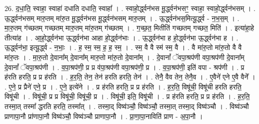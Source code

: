 \documentclass[17pt]{extarticle}
\begin{document}
26. द॒धा॒ति॒ स्वाहा॒ स्वाहा॑ दधाति दधाति॒ स्वाहा᳚ । . स्वाहो॒र्द्ध्वन॑भस मू॒र्द्ध्वन॑भसꣳ॒॒ स्वाहा॒ स्वाहो॒र्द्ध्वन॑भसम् । . ऊ॒र्द्ध्वन॑भसम् मारु॒तम् मा॑रु॒त मू॒र्द्ध्वन॑भस मू॒र्द्ध्वन॑भसम् मारु॒तम् । . ऊ॒र्द्ध्वन॑भस॒मित्यू॒र्द्ध्व - न॒भ॒स॒म् । . मा॒रु॒तम् ग॑च्छतम् गच्छतम् मारु॒तम् मा॑रु॒तम् ग॑च्छतम् । . ग॒च्छ॒त॒ मितीति॑ गच्छतम् गच्छत॒ मिति॑ । . इत्या॑हा॒हे तीत्या॑ह । . आ॒हो॒र्द्ध्वन॑भा ऊ॒र्द्ध्वन॑भा आहा हो॒र्द्ध्वन॑भाः । . ऊ॒र्द्ध्वन॑भा ह हो॒र्द्ध्वन॑भा ऊ॒र्द्ध्वन॑भा ह । . ऊ॒र्द्ध्वन॑भा॒ इत्यू॒र्द्ध्व - न॒भाः॒ । . ह॒ स्म॒ स्म॒ ह॒ ह॒ स्म॒ । . स्म॒ वै वै स्म॑ स्म॒ वै । . वै मा॑रु॒तो मा॑रु॒तो वै वै मा॑रु॒तः । . मा॒रु॒तो दे॒वाना᳚म् दे॒वाना᳚म् मारु॒तो मा॑रु॒तो दे॒वाना᳚म् । . दे॒वानां᳚ ॅवपा॒श्रप॑णी वपा॒श्रप॑णी दे॒वाना᳚म् दे॒वानां᳚ ॅवपा॒श्रप॑णी । . व॒पा॒श्रप॑णी॒ प्र प्र व॑पा॒श्रप॑णी वपा॒श्रप॑णी॒ प्र । . व॒पा॒श्रप॑णी॒ इति॑ वपा - श्रप॑णी । . प्र ह॑रति हरति॒ प्र प्र ह॑रति । . ह॒र॒ति॒ तेन॒ तेन॑ हरति हरति॒ तेन॑ । . तेनै॒ वैव तेन॒ तेनै॒व । . ए॒वैने॑ एने ए॒वै वैने᳚ । . ए॒ने॒ प्र प्रैने॑ एने॒ प्र । . ए॒ने॒ इत्ये॑ने । . प्र ह॑रति हरति॒ प्र प्र ह॑रति । . ह॒र॒ति॒ विषू॑ची॒ विषू॑ची हरति हरति॒ विषू॑ची । . विषू॑ची॒ प्र प्र विषू॑ची॒ विषू॑ची॒ प्र । . विषू॑ची॒ इति॒ विषू॑ची । . प्र ह॑रति हरति॒ प्र प्र ह॑रति । . ह॒र॒ति॒ तस्मा॒त् तस्मा᳚ द्धरति हरति॒ तस्मा᳚त् । . तस्मा॒द् विष्व॑ञ्चौ॒ विष्व॑ञ्चौ॒ तस्मा॒त् तस्मा॒द् विष्व॑ञ्चौ । . विष्व॑ञ्चौ प्राणापा॒नौ प्रा॑णापा॒नौ विष्व॑ञ्चौ॒ विष्व॑ञ्चौ प्राणापा॒नौ । . प्रा॒णा॒पा॒नाविति॑ प्राण - अ॒पा॒नौ । \newline
\end{document}
